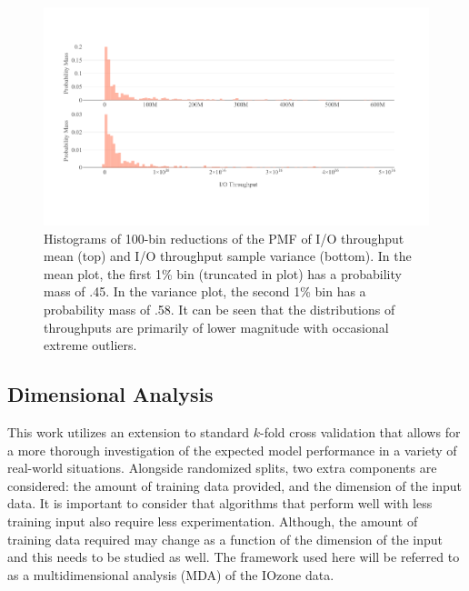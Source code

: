 \documentclass{scspaperproc}
\theoremstyle{scsthe}
\begin{document}
\begin{figure}
  \centering
  \includegraphics[width=\textwidth,trim={0 .5in 0 .4in}]{Raw_Throughput.pdf}
  \caption{Histograms of 100-bin reductions of the PMF of I/O
    throughput mean (top) and I/O throughput sample variance
    (bottom). In the mean plot, the first 1\% bin (truncated in plot)
    has a probability mass of .45. In the variance plot, the second
    1\% bin has a probability mass of .58. It can be seen that the
    distributions of throughputs are primarily of lower magnitude with
    occasional extreme outliers.}
  \label{fig:raw_throughput}
\end{figure}

\subsection{Dimensional Analysis}
This work utilizes an extension to standard $k$-fold cross validation
that allows for a more thorough investigation of the expected model
performance in a variety of real-world situations. Alongside
randomized splits, two extra components are considered: the amount of
training data provided, and the dimension of the input data. It is
important to consider that algorithms that perform well with less
training input also require less experimentation. Although, the amount
of training data required may change as a function of the dimension of
the input and this needs to be studied as well. The framework used
here will be referred to as a multidimensional analysis (MDA) of the
IOzone data.

\end{document}
